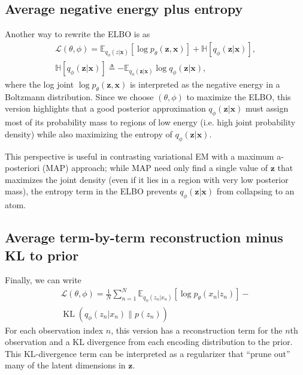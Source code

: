 \documentclass[5p,sort&compress]{elsarticle}
\begin{document}
\subsection{Average negative energy plus entropy}

Another way to rewrite the ELBO is as
\begin{equation}
\begin{aligned}
\mathcal{L}(\theta, \phi)=\mathbb{E}_{q_{\phi}(z | \boldsymbol{x})}\left[\log p_{\theta}(\boldsymbol{z}, \boldsymbol{x})\right]+\mathbb{H}\left[q_{\phi}(\boldsymbol{z} | \boldsymbol{x})\right], \\
\mathbb{H}\left[q_{\phi}(\boldsymbol{z} | \boldsymbol{x})\right] \triangleq-\mathbb{E}_{q_{\phi}(\boldsymbol{z} | \boldsymbol{x})} \log q_{\phi}(\boldsymbol{z} | \boldsymbol{x}),
\end{aligned}
\end{equation}
where the log joint $\log p_{\theta}(\boldsymbol{z}, \boldsymbol{x})$ is interpreted as the negative energy in a Boltzmann distribution. Since we choose $(\theta, \phi)$ to maximize the ELBO, this version highlights that a good posterior approximation $q_{\phi}(\boldsymbol{z} | \boldsymbol{x})$ must assign most of its probability mass to regions of low energy (i.e. high joint probability density) while also maximizing the entropy of $q_{\phi}(\boldsymbol{z} | \boldsymbol{x})$.

This perspective is useful in contrasting variational EM with a maximum a-posteriori (MAP) approach; while MAP need only find a single value of $\boldsymbol{z}$ that maximizes the joint density (even if it lies in a region with very low posterior mass), the entropy term in the ELBO prevents $q_{\phi}(\boldsymbol{z}|\boldsymbol{x})$ from collapsing to an atom.


\subsection{Average term-by-term reconstruction minus KL to prior}

Finally, we can write
\begin{equation}
\begin{aligned}
\mathcal{L}(\theta, \phi)=\frac{1}{N} \sum_{n=1}^{N} \mathbb{E}_{q_{\phi}\left(z_{n} | x_{n}\right)}\left[\log p_{\theta}\left(x_{n} | z_{n}\right)\right]- \\
\operatorname{KL}\left(q_{\phi}\left(z_{n} | x_{n}\right) \| p\left(z_{n}\right)\right)
\end{aligned}
\end{equation}
For each observation index $n$, this version has a reconstruction term for the $n$th observation and a KL divergence from each encoding distribution to the prior. This KL-divergence term can be interpreted as a regularizer that ``prune out'' many of the latent dimensions in $\boldsymbol{z}$.
\end{document}
